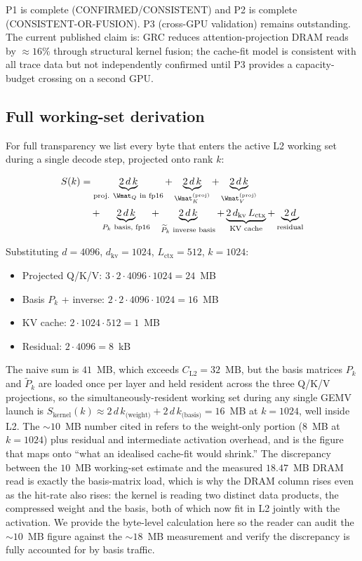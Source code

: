 \documentclass[11pt]{article}
\begin{document}
P1 is complete (CONFIRMED/CONSISTENT) and P2 is complete (CONSISTENT-OR-FUSION).
P3 (cross-GPU validation) remains outstanding.
The current published claim is: GRC reduces attention-projection DRAM reads
by $\approx16\%$ through structural kernel fusion; the cache-fit model is
consistent with all trace data but not independently confirmed until
P3 provides a capacity-budget crossing on a second GPU.

\subsection{Full working-set derivation}
\label{sec:workingset-math}

For full transparency we list every byte that enters the active L2
working set during a single decode step, projected onto rank $k$:

\begin{align}
S(k) &= \underbrace{2\,d\,k}_{\text{proj. }\Wmat_Q\text{ in fp16}}
       + \underbrace{2\,d\,k}_{\Wmat_K^{(\text{proj})}}
       + \underbrace{2\,d\,k}_{\Wmat_V^{(\text{proj})}}\notag\\
     &\quad + \underbrace{2\,d\,k}_{P_k\text{ basis, fp16}}
       + \underbrace{2\,d\,k}_{\widetilde P_k\text{ inverse basis}}
       + \underbrace{2\,d_\text{kv}\,L_\text{ctx}}_{\text{KV cache}}
       + \underbrace{2\,d}_{\text{residual}} \label{eq:Sk}
\end{align}

Substituting $d{=}4096$, $d_\text{kv}{=}1024$, $L_\text{ctx}{=}512$,
$k{=}1024$:
\begin{itemize}
\item Projected Q/K/V: $3\cdot 2\cdot 4096\cdot 1024 = 24$~MB
\item Basis $P_k$ + inverse: $2\cdot 2\cdot 4096\cdot 1024 = 16$~MB
\item KV cache: $2\cdot 1024\cdot 512 = 1$~MB
\item Residual: $2\cdot 4096 = 8$~kB
\end{itemize}

The naive sum is $41$~MB, which exceeds $C_\text{L2}{=}32$~MB, but the
basis matrices $P_k$ and $\widetilde P_k$ are loaded once per layer and
held resident across the three Q/K/V projections, so the
simultaneously-resident working set during any single GEMV
launch is $S_\text{kernel}(k) \approx 2\,d\,k_\text{(weight)} +
2\,d\,k_\text{(basis)} = 16$~MB at $k{=}1024$, well inside L2. The
${\sim}10$~MB number cited in  refers to the
weight-only portion ($8$~MB at $k{=}1024$) plus residual and
intermediate activation overhead, and is the figure that maps onto
``what an idealised cache-fit would shrink.'' The discrepancy between
the $10$~MB working-set estimate and the measured $18.47$~MB DRAM read
is exactly the basis-matrix load, which is why the DRAM column rises
even as the hit-rate also rises: the kernel is reading two distinct
data products, the compressed weight and the basis, both of which now
fit in L2 jointly with the activation. We provide the byte-level
calculation here so the reader can audit the ${\sim}10$~MB figure
against the ${\sim}18$~MB measurement and verify the discrepancy is
fully accounted for by basis traffic.
\end{document}
